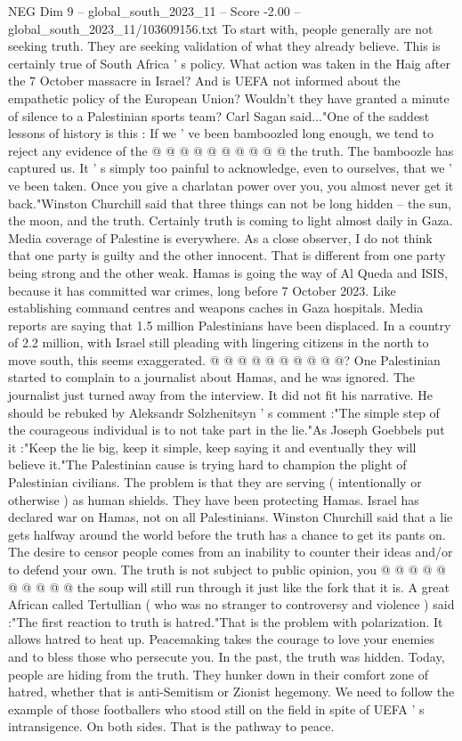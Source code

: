 \begin{textsample}{NEG Dim 9 – global\_south\_2023\_11 – Score -2.00 – global\_south\_2023\_11/103609156.txt}
To start with, people generally are not seeking truth.
They are seeking validation of what they already believe.
This is certainly true of South Africa ' s policy.
What action was taken in the Haig after the 7 October massacre in Israel?
And is UEFA not informed about the empathetic policy of the European Union?
Wouldn't they have granted a minute of silence to a Palestinian sports team?
Carl Sagan said..."One of the saddest lessons of history is this : If we ' ve been bamboozled long enough, we tend to reject any evidence of the @ @ @ @ @ @ @ @ @ @ the truth.
The bamboozle has captured us.
It ' s simply too painful to acknowledge, even to ourselves, that we ' ve been taken.
Once you give a charlatan power over you, you almost never get it back."Winston Churchill said that three things can not be long hidden -- the sun, the moon, and the truth.
Certainly truth is coming to light almost daily in Gaza.
Media coverage of Palestine is everywhere.
As a close observer, I do not think that one party is guilty and the other innocent.
That is different from one party being strong and the other weak.
Hamas is going the way of Al Queda and ISIS, because it has committed war crimes, long before 7 October 2023.
Like establishing command centres and weapons caches in Gaza hospitals.
Media reports are saying that 1.5 million Palestinians have been displaced.
In a country of 2.2 million, with Israel still pleading with lingering citizens in the north to move south, this seems exaggerated. @ @ @ @ @ @ @ @ @ @?
One Palestinian started to complain to a journalist about Hamas, and he was ignored.
The journalist just turned away from the interview.
It did not fit his narrative.
He should be rebuked by Aleksandr Solzhenitsyn ' s comment :"The simple step of the courageous individual is to not take part in the lie."As Joseph Goebbels put it :"Keep the lie big, keep it simple, keep saying it and eventually they will believe it."The Palestinian cause is trying hard to champion the plight of Palestinian civilians.
The problem is that they are serving ( intentionally or otherwise ) as human shields.
They have been protecting Hamas.
Israel has declared war on Hamas, not on all Palestinians.
Winston Churchill said that a lie gets halfway around the world before the truth has a chance to get its pants on.
The desire to censor people comes from an inability to counter their ideas and/or to defend your own.
The truth is not subject to public opinion, you @ @ @ @ @ @ @ @ @ @ the soup will still run through it just like the fork that it is.
A great African called Tertullian ( who was no stranger to controversy and violence ) said :"The first reaction to truth is hatred."That is the problem with polarization.
It allows hatred to heat up.
Peacemaking takes the courage to love your enemies and to bless those who persecute you.
In the past, the truth was hidden.
Today, people are hiding from the truth.
They hunker down in their comfort zone of hatred, whether that is anti-Semitism or Zionist hegemony.
We need to follow the example of those footballers who stood still on the field in spite of UEFA ' s intransigence.
On both sides.
That is the pathway to peace.

\end{textsample}
